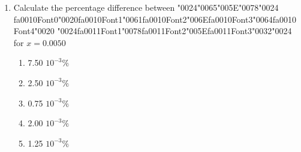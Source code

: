 \documentclass[12pt]{article}
\begin{document}
\begin{enumerate}[label=\arabic*.]
\begin{enumerate}[label=(\alph*)]
    \item no two electrons can occupy separate orbitals
    \item no two protons can have the same four quantum numbers
    \item two electrons can share the same quantum number if they are in different orbitals
    \item no two electrons can have the same four quantum numbers
    \item no two electrons can pair up if there is an empty orbital available
\end{enumerate}
\item Calculate the percentage difference between {\char"0024}{\char"0065}{\char"005E}{\char"0078}{\char"0024} {\csname fa0010Font0\endcsname\char"0020}{\csname fa0010Font1\endcsname\char"0061}{\csname fa0010Font2\endcsname\char"006E}{\csname fa0010Font3\endcsname\char"0064}{\csname fa0010Font4\endcsname\char"0020} {\char"0024}{\csname fa0011Font1\endcsname\char"0078}{\csname fa0011Font2\endcsname\char"005E}{\csname fa0011Font3\endcsname\char"0032}{\char"0024} for $x=0.0050$
\begin{enumerate}[label=(\alph*)]
    \item 7.50 $10^{-3} \%$
    \item 2.50 $10^{-3} \%$
    \item 0.75 $10^{-3} \%$
    \item 2.00 $10^{-3} \%$
    \item 1.25 $10^{-3} \%$
\end{enumerate}
\end{enumerate}
\end{document}

